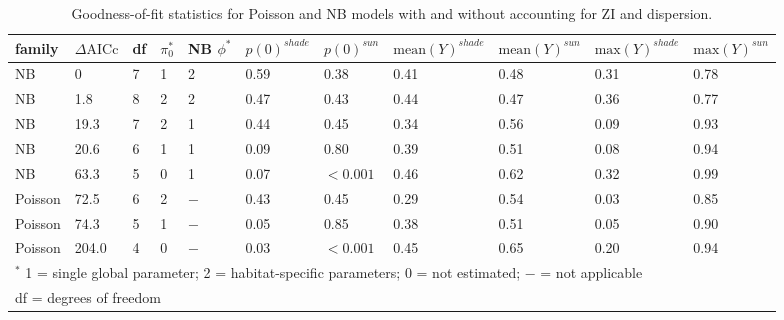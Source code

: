 \documentclass[11pt, oneside]{amsart}
\begin{document}

\newpage

\begin{table}[!htbp]
\caption{Goodness-of-fit statistics for Poisson and NB models with and without accounting for ZI and dispersion.}
\centering
\small
\begin{tabular}{lllllllllll}
\toprule
family & $\Delta \text{AICc}$ & df & $\pi_0^{*}$ & NB $\phi^{*}$ & $p(0)^{shade}$ & $p(0)^{sun}$ & $\text{mean}(Y)^{shade}$ & $\text{mean}(Y)^{sun}$ & $\text{max}(Y)^{shade}$ & $\text{max}(Y)^{sun}$ \\
\midrule
NB & 0 & 7 & 1 & 2 & 0.59 & 0.38 & 0.41 & 0.48 & 0.31 & 0.78 \\
NB & 1.8 & 8 & 2 & 2 & 0.47 & 0.43 & 0.44 & 0.47 & 0.36 & 0.77 \\
NB & 19.3 & 7 & 2 & 1 & 0.44 & 0.45 & 0.34 & 0.56 & 0.09 & 0.93 \\
NB & 20.6 & 6 & 1 & 1 & 0.09 & 0.80 & 0.39 & 0.51 & 0.08 & 0.94 \\
NB & 63.3 & 5 & 0 & 1 & 0.07 & $<0.001$ & 0.46 & 0.62 & 0.32 & 0.99 \\
Poisson & 72.5 & 6 & 2 & $-$ & 0.43 & 0.45 & 0.29 & 0.54 & 0.03 & 0.85 \\
Poisson & 74.3 & 5 & 1 & $-$ & 0.05 & 0.85 & 0.38 & 0.51 & 0.05 & 0.90 \\
Poisson & 204.0 & 4 & 0 & $-$ & 0.03 & $<0.001$ & 0.45 & 0.65 & 0.20 & 0.94 \\
\bottomrule
\multicolumn{11}{l}{$^{*}$ 1 = single global parameter; 2 = habitat-specific parameters; 0 = not estimated; $-$ = not applicable}\\
\multicolumn{11}{l}{df = degrees of freedom}
\end{tabular}
\label{default}
\end{table}
\end{document}
